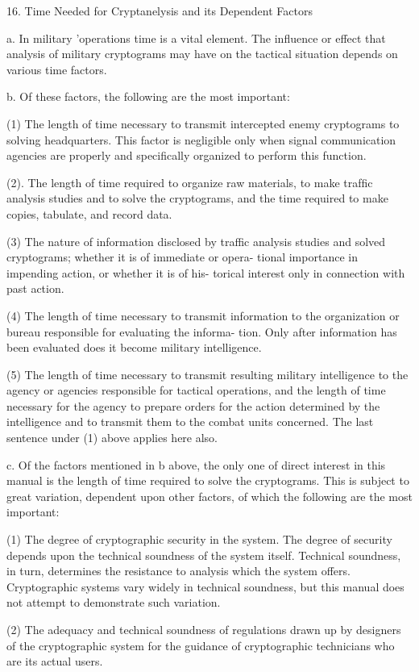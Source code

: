 16. Time Needed for Cryptanelysis and its Dependent Factors

a. In military 'operations time is a vital element. The inﬂuence or effect
that analysis of military cryptograms may have on the tactical situation
depends on various time factors.

b. Of these factors, the following are the most important:

(1) The length of time necessary to transmit intercepted enemy
cryptograms to solving headquarters. This factor is negligible
only when signal communication agencies are properly and
speciﬁcally organized to perform this function.

(2). The length of time required to organize raw materials, to make
trafﬁc analysis studies and to solve the cryptograms, and the
time required to make copies, tabulate, and record data.

(3) The nature of information disclosed by traffic analysis studies
and solved cryptograms; whether it is of immediate or opera-
tional importance in impending action, or whether it is of his-
torical interest only in connection with past action.

(4) The length of time necessary to transmit information to the
organization or bureau responsible for evaluating the informa-
tion. Only after information has been evaluated does it become
military intelligence.

(5) The length of time necessary to transmit resulting military
intelligence to the agency or agencies responsible for tactical
operations, and the length of time necessary for the agency to
prepare orders for the action determined by the intelligence and
to transmit them to the combat units concerned. The last
sentence under (1) above applies here also.

c. Of the factors mentioned in b above, the only one of direct interest
in this manual is the length of time required to solve the cryptograms.
This is subject to great variation, dependent upon other factors, of
which the following are the most important:

(1) The degree of cryptographic security in the system. The degree
of security depends upon the technical soundness of the system
itself. Technical soundness, in turn, determines the resistance
to analysis which the system offers. Cryptographic systems vary
widely in technical soundness, but this manual does not attempt
to demonstrate such variation.
 
(2) The adequacy and technical soundness of regulations drawn up
by designers of the cryptographic system for the guidance of
cryptographic technicians who are its actual users.

